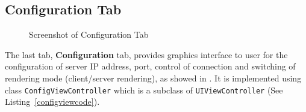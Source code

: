 \subsection{Configuration Tab}
\label{section:configuration}

\begin{figure}
\centering
{}
\hfill
{}
\label{fig:configtab}
\caption{Screenshot of Configuration Tab}
\end{figure}
The last tab, \textbf{Configuration} tab, provides graphics interface to user for the configuration of server IP address, port, control of connection and switching of rendering mode (client/server rendering), as showed in . It is implemented using class \texttt{ConfigViewController} which is a subclass of \texttt{UIViewController} (See Listing~\ref{configviewcode}). \\

